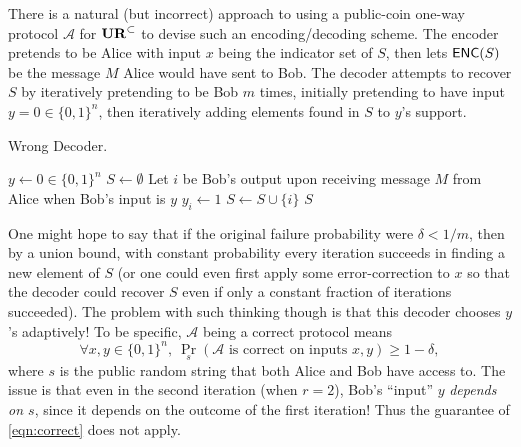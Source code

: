 There is a natural (but incorrect) approach to using a public-coin one-way protocol $\mathcal{A}$ for $\mathbf{UR}^\subset$ to devise such an encoding/decoding scheme.  The encoder pretends to be Alice with input $x$ being the indicator set of $S$, then lets $\textsf{ENC}(S)$ be the message $M$ Alice would have sent to Bob. The decoder attempts to recover $S$ by iteratively pretending to be Bob $m$ times, initially pretending to have input $y=0\in\{0,1\}^n$, then iteratively adding elements found in $S$ to $y$'s support.

\begin{algorithm}[H] 
  \caption{Wrong Decoder.} \label{algo:wrong}
  \begin{algorithmic}[1]
    \State $y\leftarrow 0\in\{0,1\}^n$
    \State $S\leftarrow \emptyset$
      \State Let $i$ be Bob's output upon receiving message $M$ from Alice when Bob's input is $y$
      \State $y_i\leftarrow 1$
      \State $S \leftarrow S \cup\{i\}$
    \EndFor
    \State \Return $S$
    \EndProcedure
  \end{algorithmic}
\end{algorithm}

One might hope to say that if the original failure probability were $\delta < 1/m$, then by a union bound, with constant probability every iteration succeeds in finding a new element of $S$ (or one could even first apply some error-correction to $x$ so that the decoder could recover $S$ even if only a constant fraction of iterations succeeded). The problem with such thinking though is that this decoder chooses $y$'s adaptively! To be specific, $\mathcal{A}$ being a correct protocol means
\begin{equation}
\forall x,y\in\{0,1\}^n,\ \Pr_s(\mathcal{A}\text{ is correct on inputs }x,y) \ge 1-\delta , \label{eqn:correct}
\end{equation}
where $s$ is the public random string that both Alice and Bob have access to. The issue is that even in the second iteration (when $r=2$), Bob's ``input'' $y$ {\em depends on $s$}, since it depends on the outcome of the first iteration! Thus the guarantee of \eqref{eqn:correct} does not apply.

